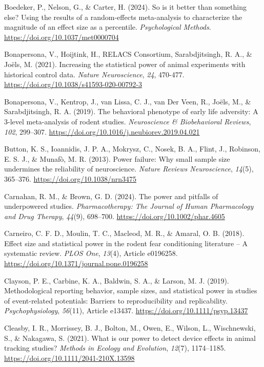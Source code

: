 \documentclass[authordate, meta, issue]{jote-new-article}
\begin{document}
	Boedeker, P., Nelson, G., \& Carter, H. (2024). So is it better than something else? Using the results of a random-effects meta-analysis to characterize the magnitude of an effect size as a percentile. \emph{Psychological Methods}. \url{https://doi.org/10.1037/met0000704}



	Bonapersona, V., Hoijtink, H., RELACS Consortium, Sarabdjitsingh, R. A., \& Joëls, M. (2021). Increasing the statistical power of animal experiments with historical control data. \emph{Nature Neuroscience}, \emph{24}, 470-477. \url{https://doi.org/10.1038/s41593-020-00792-3}



	Bonapersona, V., Kentrop, J., van Lissa, C. J., van Der Veen, R., Joëls, M., \& Sarabdjitsingh, R. A. (2019). The behavioral phenotype of early life adversity: A 3-level meta-analysis of rodent studies. \emph{Neuroscience \& Biobehavioral Reviews}, \emph{102}, 299--307. \url{https://doi.org/10.1016/j.neubiorev.2019.04.021}



	Button, K. S., Ioannidis, J. P. A., Mokrysz, C., Nosek, B. A., Flint, J., Robinson, E. S. J., \& Munafò, M. R. (2013). Power failure: Why small sample size undermines the reliability of neuroscience. \emph{Nature Reviews Neuroscience}, \emph{14}(5), 365--376. \url{https://doi.org/10.1038/nrn3475}



	Carnahan, R. M., \& Brown, G. D. (2024). The power and pitfalls of underpowered studies. \emph{Pharmacotherapy: The Journal of Human Pharmacology and Drug Therapy}, \emph{44}(9), 698--700. \url{https://doi.org/10.1002/phar.4605}



	Carneiro, C. F. D., Moulin, T. C., Macleod, M. R., \& Amaral, O. B. (2018). Effect size and statistical power in the rodent fear conditioning literature -- A systematic review. \emph{PLOS One}, \emph{13}(4), Article e0196258. \url{https://doi.org/10.1371/journal.pone.0196258}



	Clayson, P. E., Carbine, K. A., Baldwin, S. A., \& Larson, M. J. (2019). Methodological reporting behavior, sample sizes, and statistical power in studies of event-related potentials: Barriers to reproducibility and replicability. \emph{Psychophysiology}, \emph{56}(11), Article e13437. \url{https://doi.org/10.1111/psyp.13437}



	Cleasby, I. R., Morrissey, B. J., Bolton, M., Owen, E., Wilson, L., Wischnewski, S., \& Nakagawa, S. (2021). What is our power to detect device effects in animal tracking studies? \emph{Methods in Ecology and Evolution}, \emph{12}(7), 1174--1185. \url{https://doi.org/10.1111/2041-210X.13598}
\end{document}
